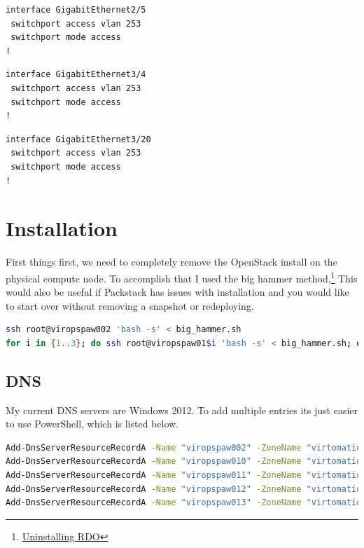 \documentclass[11pt,letterpaper,oneside]{book}
\begin{document}
\begin{lstlisting}[caption={Nova Node uplink interface; gi2/5},language=bash]
interface GigabitEthernet2/5
 switchport access vlan 253
 switchport mode access
!
\end{lstlisting}
\begin{lstlisting}[caption={Virtual Machine uplink; gi3/4},language=bash]
interface GigabitEthernet3/4
 switchport access vlan 253
 switchport mode access
!
\end{lstlisting}

\begin{lstlisting}[caption={Virtual Machine uplink; gi3/20},language=bash]
interface GigabitEthernet3/20
 switchport access vlan 253
 switchport mode access
!
\end{lstlisting}

\section{Installation}

First things first, we need to completely remove the OpenStack install on the physical compute node.  To accomplish that I used the big hammer method.\footnote{\href{http://openstack.redhat.com/Uninstalling_RDO}{Uninstalling RDO}}  This would also be useful if Packstack has issues with installation and you would like to start over without removing a snapshot or redeploying.

\begin{lstlisting}[caption={Remove OpenStack from all nodes},language=bash]
ssh root@viropspaw002 'bash -s' < big_hammer.sh
for i in {1..3}; do ssh root@viropspaw01$i 'bash -s' < big_hammer.sh; done
\end{lstlisting}


\subsection{DNS}
My current DNS servers are Windows 2012.  To add multiple entries its just easier to use PowerShell, which is listed below.

\begin{lstlisting}[caption={DNS Entries},language=bash]
Add-DnsServerResourceRecordA -Name "viropspaw002" -ZoneName "virtomation.com" -IPv4Address 10.53.253.70 -ComputerName 10.53.252.123
Add-DnsServerResourceRecordA -Name "viropspaw010" -ZoneName "virtomation.com" -IPv4Address 10.53.253.90 -ComputerName 10.53.252.123
Add-DnsServerResourceRecordA -Name "viropspaw011" -ZoneName "virtomation.com" -IPv4Address 10.53.253.100 -ComputerName 10.53.252.123
Add-DnsServerResourceRecordA -Name "viropspaw012" -ZoneName "virtomation.com" -IPv4Address 10.53.253.110 -ComputerName 10.53.252.123
Add-DnsServerResourceRecordA -Name "viropspaw013" -ZoneName "virtomation.com" -IPv4Address 10.53.253.120 -ComputerName 10.53.252.123
\end{lstlisting}
\end{document}
